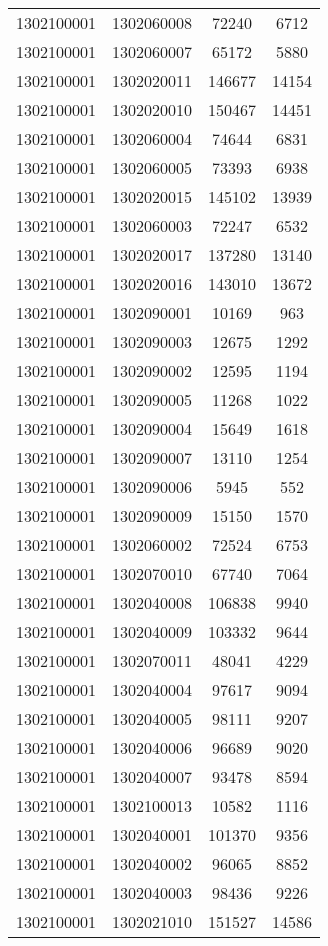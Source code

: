 \begin{longtable}{llcc}
1302100001 & 1302060008 & 72240 & 6712\\
1302100001 & 1302060007 & 65172 & 5880\\
1302100001 & 1302020011 & 146677 & 14154\\
1302100001 & 1302020010 & 150467 & 14451\\
1302100001 & 1302060004 & 74644 & 6831\\
1302100001 & 1302060005 & 73393 & 6938\\
1302100001 & 1302020015 & 145102 & 13939\\
1302100001 & 1302060003 & 72247 & 6532\\
1302100001 & 1302020017 & 137280 & 13140\\
1302100001 & 1302020016 & 143010 & 13672\\
1302100001 & 1302090001 & 10169 & 963\\
1302100001 & 1302090003 & 12675 & 1292\\
1302100001 & 1302090002 & 12595 & 1194\\
1302100001 & 1302090005 & 11268 & 1022\\
1302100001 & 1302090004 & 15649 & 1618\\
1302100001 & 1302090007 & 13110 & 1254\\
1302100001 & 1302090006 & 5945 & 552\\
1302100001 & 1302090009 & 15150 & 1570\\
1302100001 & 1302060002 & 72524 & 6753\\
1302100001 & 1302070010 & 67740 & 7064\\
1302100001 & 1302040008 & 106838 & 9940\\
1302100001 & 1302040009 & 103332 & 9644\\
1302100001 & 1302070011 & 48041 & 4229\\
1302100001 & 1302040004 & 97617 & 9094\\
1302100001 & 1302040005 & 98111 & 9207\\
1302100001 & 1302040006 & 96689 & 9020\\
1302100001 & 1302040007 & 93478 & 8594\\
1302100001 & 1302100013 & 10582 & 1116\\
1302100001 & 1302040001 & 101370 & 9356\\
1302100001 & 1302040002 & 96065 & 8852\\
1302100001 & 1302040003 & 98436 & 9226\\
1302100001 & 1302021010 & 151527 & 14586\\

\end{longtable}
